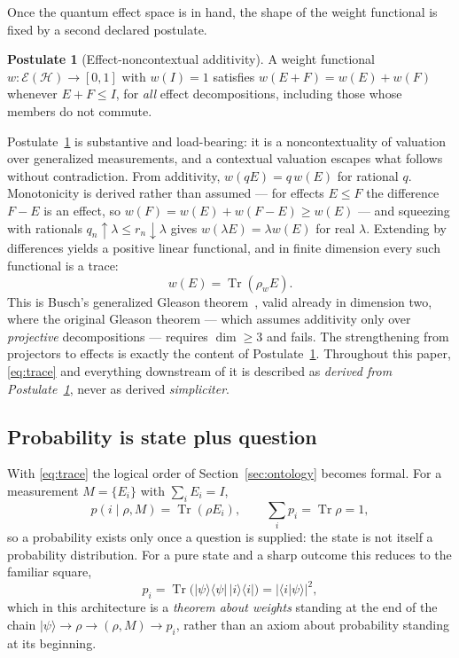 \documentclass[11pt,a4paper]{article}
\newcommand{\Tr}{\operatorname{Tr}}
\theoremstyle{definition}
\newtheorem{postulate}{Postulate}
\theoremstyle{plain}
\theoremstyle{remark}
\begin{document}
Once the quantum effect space is in hand, the shape of the weight
functional is fixed by a second declared postulate.

\begin{postulate}[Effect-noncontextual additivity]
\label{post:B}
A weight functional $w:\mathcal{E}(\mathcal{H})\to[0,1]$ with $w(I)=1$
satisfies $w(E+F) = w(E) + w(F)$ whenever $E+F\le I$, for \emph{all}
effect decompositions, including those whose members do not commute.
\end{postulate}

\noindent Postulate~\ref{post:B} is substantive and load-bearing: it is a
noncontextuality of valuation over generalized measurements, and a
contextual valuation escapes what follows without contradiction. From
additivity, $w(qE) = q\,w(E)$ for rational $q$. Monotonicity is derived
rather than assumed --- for effects $E\le F$ the difference $F-E$ is an
effect, so $w(F) = w(E) + w(F-E) \ge w(E)$ --- and squeezing with
rationals $q_n\uparrow\lambda\le r_n\downarrow\lambda$ gives
$w(\lambda E) = \lambda w(E)$ for real $\lambda$. Extending by
differences yields a positive linear functional, and in finite dimension
every such functional is a trace:
\begin{equation}
w(E) = \Tr(\rho_w E).
\label{eq:trace}
\end{equation}
This is Busch's generalized Gleason theorem~\cite{busch}, valid already
in dimension two, where the original Gleason theorem --- which assumes
additivity only over \emph{projective} decompositions --- requires
$\dim\ge3$ and fails. The strengthening from projectors to effects is
exactly the content of Postulate~\ref{post:B}. Throughout this paper,
\eqref{eq:trace} and everything downstream of it is described as
\emph{derived from Postulate~\ref{post:B}}, never as derived
\emph{simpliciter}.

\subsection{Probability is state plus question}

With \eqref{eq:trace} the logical order of Section~\ref{sec:ontology}
becomes formal. For a measurement $M = \{E_i\}$ with $\sum_i E_i = I$,
\begin{equation}
p(i \mid \rho, M) = \Tr(\rho E_i), \qquad \sum_i p_i = \Tr\rho = 1 ,
\end{equation}
so a probability exists only once a question is supplied: the state is
not itself a probability distribution. For a pure state and a sharp
outcome this reduces to the familiar square,
\begin{equation}
p_i = \Tr\big(|\psi\rangle\langle\psi|\,|i\rangle\langle i|\big)
    = |\langle i|\psi\rangle|^2 ,
\label{eq:born}
\end{equation}
which in this architecture is a \emph{theorem about weights} standing at
the end of the chain $|\psi\rangle \to \rho \to (\rho,M) \to p_i$, rather
than an axiom about probability standing at its beginning.
\end{document}
